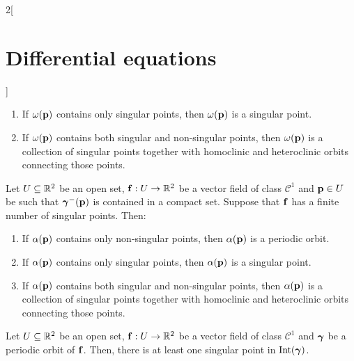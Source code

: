 \documentclass[../../../main_math.tex]{subfiles}
\begin{document}
\begin{multicols}{2}[\section{Differential equations}]
\begin{theorem}
\begin{enumerate}
      \item If $\omega(\boldsymbol{\mathrm{p}})$ contains only singular points, then $\omega(\boldsymbol{\mathrm{p}})$ is a singular point.
      \item If $\omega(\boldsymbol{\mathrm{p}})$ contains both singular and non-singular points, then $\omega(\boldsymbol{\mathrm{p}})$ is a collection of singular points together with homoclinic and heteroclinic orbits connecting those points.
    \end{enumerate}
  \end{theorem}
  \begin{corollary}
    Let $U\subseteq \mathbb{R}^2$ be an open set, $\boldsymbol{\mathrm{f}}:U\rightarrow\mathbb{R}^2$ be a vector field of class $\mathcal{C}^1$ and $\boldsymbol{\mathrm{p}}\in U$ be such that ${\boldsymbol{\mathrm{\gamma}}}^-(\boldsymbol{\mathrm{p}})$ is contained in a compact set. Suppose that $\boldsymbol{\mathrm{f}}$ has a finite number of singular points. Then:
    \begin{enumerate}
      \item If $\alpha(\boldsymbol{\mathrm{p}})$ contains only non-singular points, then $\alpha(\boldsymbol{\mathrm{p}})$ is a periodic orbit.
      \item If $\alpha(\boldsymbol{\mathrm{p}})$ contains only singular points, then $\alpha(\boldsymbol{\mathrm{p}})$ is a singular point.
      \item If $\alpha(\boldsymbol{\mathrm{p}})$ contains both singular and non-singular points, then $\alpha(\boldsymbol{\mathrm{p}})$ is a collection of singular points together with homoclinic and heteroclinic orbits connecting those points.
    \end{enumerate}
  \end{corollary}
  \begin{corollary}
    Let $U\subseteq \mathbb{R}^2$ be an open set, $\boldsymbol{\mathrm{f}}:U\rightarrow\mathbb{R}^2$ be a vector field of class $\mathcal{C}^1$ and ${\boldsymbol{\mathrm{\gamma}}}$ be a periodic orbit of $\boldsymbol{\mathrm{f}}$. Then, there is at least one singular point in $\operatorname{Int}(\boldsymbol{\mathrm{\gamma}})$.
  \end{corollary}

\end{multicols}
\end{document}
